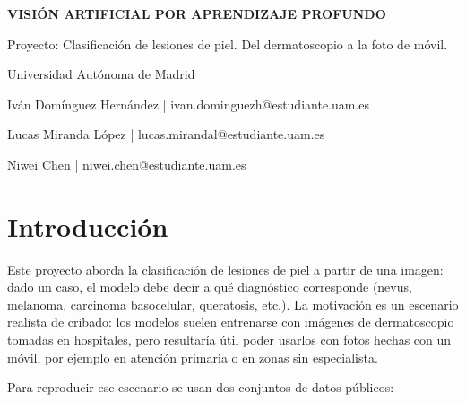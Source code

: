 \documentclass[10pt,a4paper]{article}
\renewcommand{\_}{\guionbajo\allowbreak}
\begin{document}
\sloppy

\begin{titlepage}
    \centering
    \vfill
    {\huge \textbf{VISIÓN ARTIFICIAL POR APRENDIZAJE PROFUNDO} \par}
    \vspace{2cm}
    {\Large Proyecto: Clasificación de lesiones de piel. Del dermatoscopio a la foto de móvil. \par}
    \vspace{1cm}
    {\Large Universidad Autónoma de Madrid \par}
    \vspace{1cm}
    {\large Iván Domínguez Hernández |  ivan.dominguezh@estudiante.uam.es \par}
    \vspace{.5cm}
    {\large Lucas Miranda López | lucas.mirandal@estudiante.uam.es \par}
    \vspace{.5cm}
    {\large Niwei Chen | niwei.chen@estudiante.uam.es \par}
    \vspace{1cm}
\end{titlepage}

\tableofcontents

\newpage


\section{Introducción}
\label{sec:introduccion}

\noindent Este proyecto aborda la clasificación de lesiones de piel a partir de una imagen: dado un caso, el modelo debe decir
a qué diagnóstico corresponde (nevus, melanoma, carcinoma basocelular, queratosis, etc.). La motivación es un escenario
realista de cribado: los modelos suelen entrenarse con imágenes de dermatoscopio tomadas en hospitales, pero resultaría
útil poder usarlos con fotos hechas con un móvil, por ejemplo en atención primaria o en zonas sin especialista.

\medskip

\noindent Para reproducir ese escenario se usan dos conjuntos de datos públicos:
\end{document}

